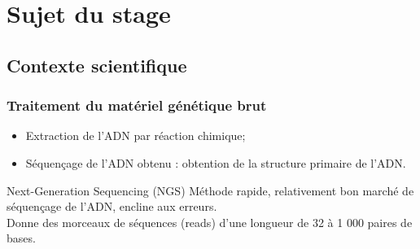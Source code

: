 \documentclass{beamer}
\begin{document}
\section{Sujet du stage}





\subsection{Contexte scientifique}


\begin{frame}
\frametitle{Traitement du matériel génétique brut}

\begin{itemize}
\item Extraction de l'ADN par réaction chimique;
\item Séquençage de l'ADN obtenu : obtention de la \alert{structure primaire} de l'ADN.
\end{itemize}

\begin{block}{Next-Generation Sequencing (NGS)}
Méthode rapide, relativement bon marché de séquençage de l'ADN, encline aux erreurs. \\
Donne des morceaux de séquences (\alert{reads}) d'une longueur de 32 à 1 000 paires de bases.
\end{block}

\end{frame}
\end{document}
